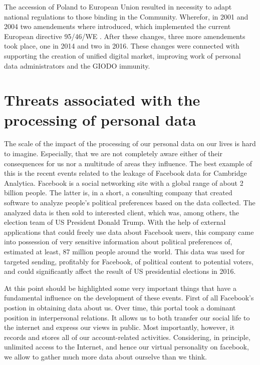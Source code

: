 \documentclass[en, noamssymb]{mgr}
\begin{document}
\indent The accession of Poland to European Union resulted in necessity to adapt national regulations to those binding in the Community. Wherefor, in 2001 and 2004 two amendements where introduced, which implemented the current European directive 95/46/WE \cite{prawo_odo}. After these changes, three more amendements took place, one in 2014 and two in 2016. These changes were connected with supporting the creation of unified digital market, improving work of personal data administrators and the GIODO immunity.



\section{Threats associated with the processing of personal data}

The scale of the impact of the processing of our personal data on our lives is hard to imagine. Especially, that we are not completely aware either of their consequences for us nor a multitude of areas they influence. The best example of this is the recent events related to the leakage of Facebook data for Cambridge Analytica. Facebook is a social networking site with a global range of about 2 billion people. The latter is, in a short, a consulting company that created software to analyze people's political preferences based on the data collected. The analyzed data is then sold to interested client, which was, among others, the election team of US President Donald Trump. With the help of external applications that could freely use data about Facebook users, this company came into possession of very sensitive information about political preferences of, estimated at least, 87 million people around the world. This data was used for targeted sending, profitably for Facebook, of political content to potential voters, and could significantly affect the result of US presidential elections in 2016.

\indent At this point should be highlighted some very important things that have a fundamental influence on the development of these events. First of all Facebook's postion in obtaining data about us. Over time, this portal took a dominant position in interpersonal relations. It allows us to both transfer our social life to the internet and express our views in public. Most importantly, however, it records and stores all of our account-related activities. Considering, in principle, unlimited access to the Internet, and hence our virtual personality on facebook, we allow to gather much more data about ourselve than we think. 
\end{document}
